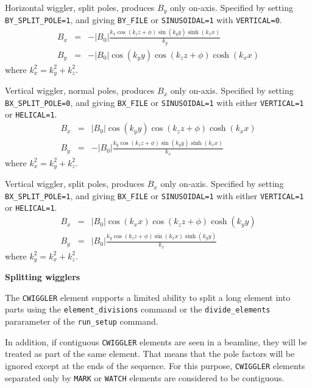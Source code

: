 Horizontal wiggler, split poles, produces $B_y$ only on-axis.   Specified
by setting {\tt BY\_SPLIT\_POLE=1}, and giving {\tt BY\_FILE} or {\tt SINUSOIDAL=1} with {\tt VERTICAL=0}.
\begin{eqnarray}
B_x & = & -\left|B_0\right| \frac{k_x \cos (k_z z + \phi) \sin (k_y y) \sinh (k_x x)}{k_y}\\
B_y & = & -\left|B_0\right| \cos (k_y y) \cos (k_z z + \phi) \cosh (k_x x)
\end{eqnarray}
where $k_x^2 = k_y^2 + k_z^2$.

Vertical wiggler, normal poles, produces $B_x$ only on-axis.   Specified
by setting {\tt BX\_SPLIT\_POLE=0}, and giving {\tt BX\_FILE} or {\tt SINUSOIDAL=1} with either {\tt VERTICAL=1} or
{\tt HELICAL=1}.
\begin{eqnarray}
B_x & = & \left|B_0\right| \cos (k_y y) \cos (k_z z + \phi) \cosh (k_x x)\\
B_y & = & -\left|B_0\right| \frac{k_y \cos (k_z z + \phi) \sin (k_y y) \sinh (k_x x)}{k_x}
\end{eqnarray}
where $k_x^2 = k_y^2 + k_z^2$.

Vertical wiggler, split poles, produces $B_x$ only on-axis.   Specified
by setting {\tt BX\_SPLIT\_POLE=1}, and giving {\tt BX\_FILE} or {\tt SINUSOIDAL=1} with either {\tt VERTICAL=1} or
{\tt HELICAL=1}.
\begin{eqnarray}
B_x & = & \left|B_0\right| \cos (k_x x) \cos (k_z z + \phi) \cosh (k_y y)\\
B_y & = & \left|B_0\right| \frac{k_y \cos (k_z z + \phi) \sin (k_x x) \sinh (k_y y)}{k_x}
\end{eqnarray}
where $k_y^2 = k_x^2 + k_z^2$.

{\bf Splitting wigglers}

The \verb|CWIGGLER| element supports a limited ability to split a long element into parts using the
\verb|element_divisions| command or the \verb|divide_elements| pararameter of the \verb|run_setup| command.

In addition, if contiguous \verb|CWIGGLER| elements are seen in a beamline, they will be treated as part of the
same element. That means that the pole factors will be ignored except at the ends of the sequence.
For this purpose, \verb|CWIGGLER| elements separated only by \verb|MARK| or \verb|WATCH| elements are considered
to be contiguous. 


